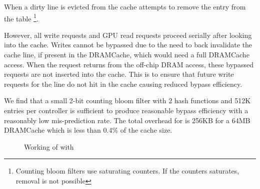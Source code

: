 When a dirty line is evicted from the cache \bypassname attempts to remove the entry from the table \footnote{Counting bloom filters use saturating counters. If the counters saturates, removal is not possible}.
\par However, all write requests and GPU read requests proceed serially after looking into the cache. Writes cannot be bypassed due to the need to back invalidate the cache line, if present in the DRAMCache, which would need a full DRAMCache access.
When the request returns from the off-chip DRAM access, these bypassed requests are not inserted into the cache. This is to ensure that future write requests for the line do not hit in the cache causing reduced bypass efficiency.
\par We find that a small 2-bit counting bloom filter with 2 hash functions and 512K entries per controller is sufficient to produce reasonable bypass efficiency with a reasonably low mis-prediction rate. The total overhead for \bypassname is 256KB for a 64MB DRAMCache which is less than 0.4\% of the cache size.

\begin{figure}[htb]
    \centering
    \bloom
    \caption{Working of \cachename with \bypassname }
    \label{fig:bye}
\end{figure}

